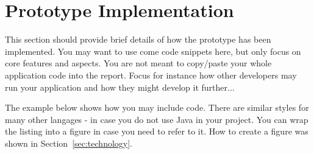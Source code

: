 \section{Prototype Implementation}
\label{sec:implementation}

This section should provide brief details of how the prototype has been implemented.
You may want to use come code snippets here, but only focus on core features and aspects.
You are not meant to copy/paste your whole application code into the report.
Focus for instance how other developers may run your application and how they might develop it further...


The example below shows how you may include code. There are similar
styles for many other langages - in case you do not use Java in your
project. You can wrap the listing into a figure in case you need to
refer to it. How to create a figure was shown in Section~\ref{sec:technology}.


